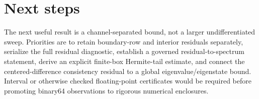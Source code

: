 \documentclass[11pt]{article}
\begin{document}
\section{Next steps}

The next useful result is a channel-separated bound, not a larger undifferentiated
sweep.  Priorities are to retain boundary-row and interior residuals separately,
serialize the full residual diagnostic, establish a governed residual-to-spectrum
statement, derive an explicit finite-box Hermite-tail estimate, and connect the
centered-difference consistency residual to a global eigenvalue/eigenstate bound.
Interval or otherwise checked floating-point certificates would be required before
promoting binary64 observations to rigorous numerical enclosures.



\end{document}
